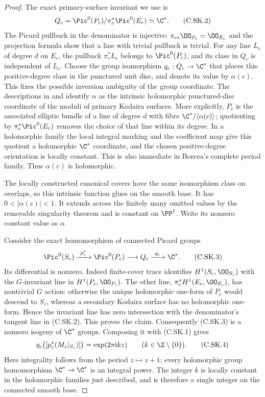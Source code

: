 \begin{proof}
The exact primary-surface invariant we use is
\[
 Q_c=\Pic^0(P_c)/\pi_c^*\Pic^0(E_c)\simeq\C^*.
\tag{C.SK.2}
\]
The Picard pullback in the denominator is injective:
$\pi_{c*}\OO_{P_c}=\OO_{E_c}$ and the projection formula
show that a line with trivial pullback is trivial. For
any line $L_c$ of degree $d$ on $E_c$, the pullback
$\pi_c^*L_c$ belongs to $\Pic^0(P_c)$, and its class in
$Q_c$ is independent of $L_c$. Choose the group
isomorphism $q_c:Q_c\to\C^*$ that places this
positive-degree class in the punctured unit disc, and
denote its value by $\alpha(c)$.
This fixes the possible inversion ambiguity of the
group coordinate. The descriptions in
\cite[Theorem~4 and Remark~1]{Borcea1984} and
\cite[\S1, pp.~2--3]{SS2002} identify $\alpha$ as the
intrinsic holomorphic punctured-disc coordinate of the
moduli of primary Kodaira surfaces. More explicitly,
$P_c$ is the associated elliptic bundle of a line of
degree $d$ with fibre $\C^*/\langle\alpha(c)\rangle$;
quotienting by $\pi_c^*\Pic^0(E_c)$ removes the choice
of that line within its degree. In a holomorphic
family the local integral marking and the coefficient
map give this quotient a holomorphic $\C^*$ coordinate,
and the chosen positive-degree orientation is locally
constant. This is also immediate in Borcea's complete
period family. Thus $\alpha(c)$ is holomorphic.

The locally constructed canonical covers have the same
isomorphism class on overlaps, so this intrinsic
function glues on the smooth base. It has
$0<|\alpha(c)|<1$. It extends across the finitely many
omitted values by the removable singularity theorem
and is constant on $\PP^1$. Write its nonzero constant
value as $\alpha$.

Consider the exact homomorphism of connected Picard
groups
\[
 \Pic^0(S_c)\xrightarrow{\ p_c^*\ }\Pic^0(P_c)
          \longrightarrow Q_c\xrightarrow{\ q_c\ }\C^*.
\tag{C.SK.3}
\]
Its differential is nonzero. Indeed finite-cover trace
identifies $H^1(S_c,\OO_{S_c})$ with the $G$-invariant
line in $H^1(P_c,\OO_{P_c})$. The other line,
$\pi_c^*H^1(E_c,\OO_{E_c})$, has nontrivial $G$ action:
otherwise the unique holomorphic one-form of $P_c$
would descend to $S_c$, whereas a secondary Kodaira
surface has no holomorphic one-form. Hence the invariant
line has zero intersection with the denominator's
tangent line in (C.SK.2). This proves the claim.
Consequently (C.SK.3) is a nonzero isogeny of $\C^*$
groups. Composing it with (C.SK.1) gives
\[
 q_c\bigl([p_c^*(M_z|_{S_c})]\bigr)
       =\exp(2\pi\mathrm i k z)
       \qquad(k\in\Z\setminus\{0\}).
\tag{C.SK.4}
\]
Here integrality follows from the period $z\mapsto z+1$;
every holomorphic group homomorphism $\C^*\to\C^*$ is
an integral power. The integer $k$ is locally constant
in the holomorphic families just described, and is
therefore a single integer on the connected smooth base.


\end{proof}
